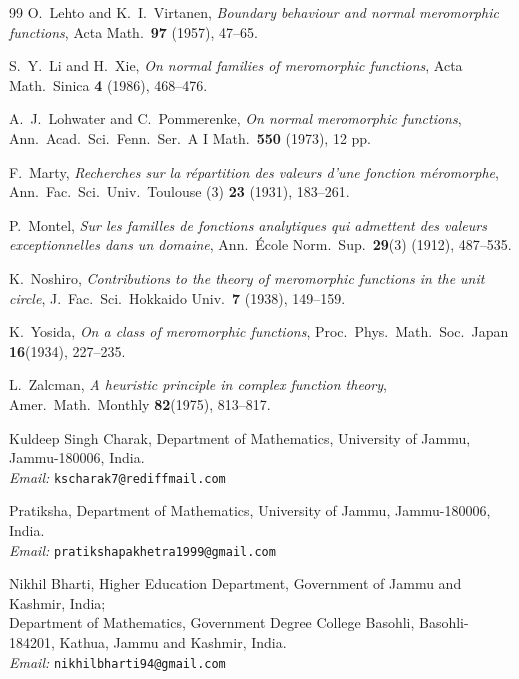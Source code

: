 \documentclass[11pt,reqno]{amsart}
\theoremstyle{definition}
\begin{document}
\begin{thebibliography}{99}
 O.~Lehto and K.~I.~Virtanen,
\emph{Boundary behaviour and normal meromorphic functions}, Acta Math.\ \textbf{97} (1957),
47--65.

 S.~Y.~Li and H.~Xie,
\emph{On normal families of meromorphic functions}, Acta Math.\ Sinica \textbf{4} (1986),
468--476.

 A.~J.~Lohwater and C.~Pommerenke,
\emph{On normal meromorphic functions}, Ann.\ Acad.\ Sci.\ Fenn.\ Ser.\ A I Math.\
\textbf{550} (1973), 12 pp.

 F.~Marty,
\emph{Recherches sur la r\'epartition des valeurs d'une fonction m\'eromorphe}, Ann.\ Fac.\
Sci.\ Univ.\ Toulouse (3) \textbf{23} (1931), 183--261.

 P.~Montel,
\emph{Sur les familles de fonctions analytiques qui admettent des valeurs exceptionnelles
dans un domaine}, Ann.\ \'Ecole Norm.\ Sup.\ \textbf{29}(3) (1912), 487--535.

\bibitem{Noshiro} K.~Noshiro,
\emph{Contributions to the theory of meromorphic functions in the unit circle}, J.\ Fac.\
Sci.\ Hokkaido Univ.\ \textbf{7} (1938), 149--159.

\bibitem{Yosida} K.~Yosida,
\emph{On a class of meromorphic functions}, Proc.\ Phys.\ Math.\ Soc.\ Japan \textbf{16}(1934), 227--235.

\bibitem{Zalcman} L.~Zalcman,
\emph{A heuristic principle in complex function theory}, Amer.\ Math.\ Monthly \textbf{82}(1975), 813--817.
\end{thebibliography}

\bigskip
\noindent
Kuldeep Singh Charak, Department of Mathematics, University of Jammu, Jammu-180006, India.\\
\emph{Email:} \texttt{kscharak7@rediffmail.com}

\medskip
\noindent
Pratiksha, Department of Mathematics, University of Jammu, Jammu-180006, India.\\
\emph{Email:} \texttt{pratikshapakhetra1999@gmail.com}

\medskip
\noindent
Nikhil Bharti, Higher Education Department, Government of Jammu and Kashmir, India;\\
Department of Mathematics, Government Degree College Basohli, Basohli-184201, Kathua,
Jammu and Kashmir, India.\\
\emph{Email:} \texttt{nikhilbharti94@gmail.com}
\end{document}
